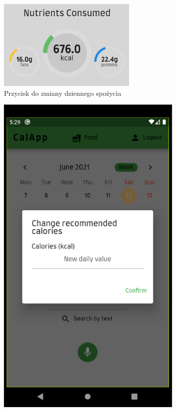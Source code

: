 \documentclass[12pt, a4paper]{article}
\begin{document}
\begin{sloppypar}
{{    \begin{figure}[H]
      \centering
      \begin{subfigure}{.5\textwidth}
        \centering
        \includegraphics[width=.9\linewidth]{clickable_radial.PNG}
        \caption{Przycisk do zmiany dziennego spożycia}
        \label{fig:clickable_radial}
      \end{subfigure}%
      \begin{subfigure}{.5\textwidth}
        \centering
        \includegraphics[width=.9\linewidth]{screen_changeIntake_alert.PNG}

\end{subfigure}
\end{figure}}}
\end{sloppypar}
\end{document}
